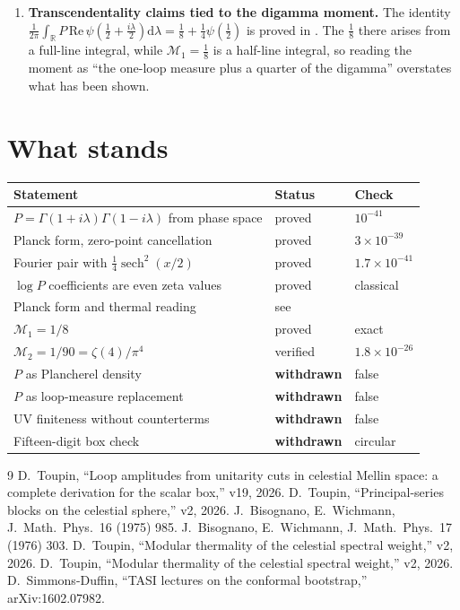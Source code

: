 \documentclass[12pt,a4paper]{article}
\theoremstyle{plain}
\theoremstyle{definition}
\theoremstyle{remark}
\newcommand{\R}{\mathbb{R}}
\newcommand{\dd}{\mathrm{d}}
\newcommand{\cM}{\mathcal{M}}
\begin{document}
\begin{enumerate}
\item \textbf{Transcendentality claims tied to the digamma moment.} The
identity
$\tfrac{1}{2\pi}\int_\R P\,\mathrm{Re}\,\psi(\tfrac12+\tfrac{i\lambda}{2})
\dd\lambda=\tfrac18+\tfrac14\psi(\tfrac12)$ is proved in
\cite{ToupinBlocks}. The $\tfrac18$ there arises from a full-line
integral, while $\cM_1=\tfrac18$ is a half-line integral, so reading
the moment as ``the one-loop measure plus a quarter of the digamma''
overstates what has been shown.
\end{enumerate}

\section{What stands}

\begin{center}
\begin{tabular}{lll}
\toprule
Statement & Status & Check \\
\midrule
$P=\Gamma(1+i\lambda)\Gamma(1-i\lambda)$ from phase space & proved & $10^{-41}$ \\
Planck form, zero-point cancellation & proved & $3\times10^{-39}$ \\
Fourier pair with $\tfrac14\operatorname{sech}^2(x/2)$ & proved & $1.7\times10^{-41}$ \\
$\log P$ coefficients are even zeta values & proved & classical \\
Planck form and thermal reading & see \cite{ToupinThermal} & \\
$\cM_1=1/8$ & proved & exact \\
$\cM_2=1/90=\zeta(4)/\pi^4$ & verified & $1.8\times10^{-26}$ \\
$P$ as Plancherel density & \textbf{withdrawn} & false \\
$P$ as loop-measure replacement & \textbf{withdrawn} & false \\
UV finiteness without counterterms & \textbf{withdrawn} & false \\
Fifteen-digit box check & \textbf{withdrawn} & circular \\
\bottomrule
\end{tabular}
\end{center}

\begin{thebibliography}{9}
 D.~Toupin, ``Loop amplitudes from unitarity cuts
in celestial Mellin space: a complete derivation for the scalar box,''
v19, 2026.
 D.~Toupin, ``Principal-series blocks on the
celestial sphere,'' v2, 2026.
 J.~Bisognano, E.~Wichmann, J.\ Math.\ Phys.\ 16 (1975)
985.
 J.~Bisognano, E.~Wichmann, J.\ Math.\ Phys.\ 17 (1976)
303.
 D.~Toupin, ``Modular thermality of the
celestial spectral weight,'' v2, 2026.
 D.~Toupin, ``Modular thermality of the
celestial spectral weight,'' v2, 2026.
 D.~Simmons-Duffin, ``TASI lectures on the
conformal bootstrap,'' arXiv:1602.07982.
\end{thebibliography}
\end{document}

